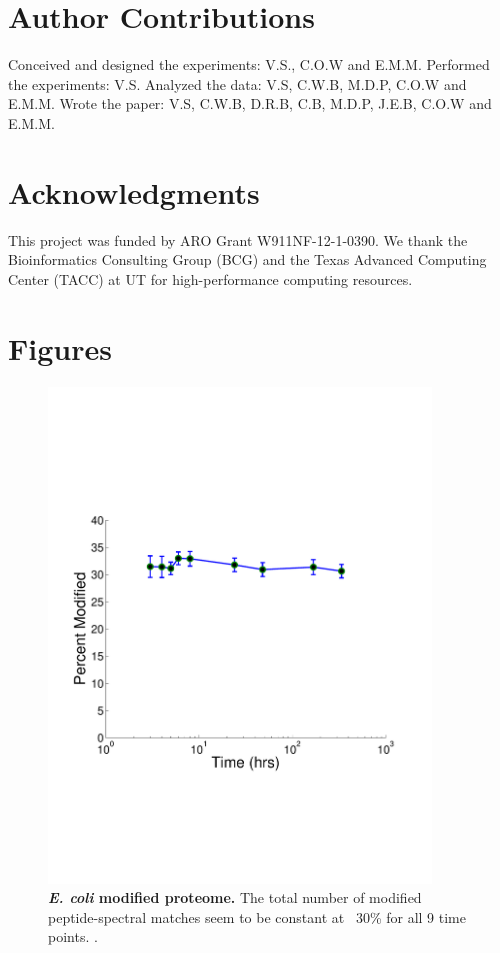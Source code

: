 \documentclass[12pt]{article}
\begin{document}

\section{Author Contributions}
Conceived and designed the experiments: V.S., C.O.W and E.M.M. Performed the experiments: V.S. Analyzed the data: V.S, C.W.B, M.D.P, C.O.W and E.M.M. Wrote the paper: V.S, C.W.B, D.R.B, C.B, M.D.P, J.E.B, C.O.W and E.M.M.

\section{Acknowledgments}
This project was funded by ARO Grant W911NF-12-1-0390. We thank the Bioinformatics Consulting Group (BCG) and the Texas Advanced Computing Center (TACC) at UT for high-performance computing resources. 




\newpage

\section*{Figures}

\begin{figure}[!ht]
\centerline{\includegraphics[width=4in]{Figures/PTM_modified.pdf}}
\caption{\label{fig:ModifiedPTM}\textbf{\emph{E. coli} modified proteome.} The total number of modified peptide-spectral matches seem to be constant at ~30\% for all 9 time points. .
}
\end{figure}
\end{document}
